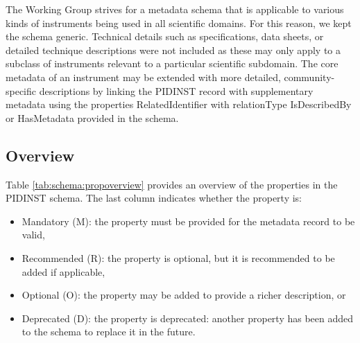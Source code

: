 \documentclass[titlepage=true,twoside=false,DIV=13]{scrartcl}
\begin{document}
The Working Group strives for a metadata schema that is applicable to
various kinds of instruments being used in all scientific domains.
For this reason, we kept the schema generic.  Technical details such
as specifications, data sheets, or detailed technique descriptions
were not included as these may only apply to a subclass of instruments
relevant to a particular scientific subdomain.  The core metadata of
an instrument may be extended with more detailed, community-specific
descriptions by linking the PIDINST record with supplementary metadata
using the properties RelatedIdentifier with relationType IsDescribedBy
or HasMetadata provided in the schema.

\subsection{Overview}

Table \ref{tab:schema:propoverview} provides an overview of the
properties in the PIDINST schema.  The last column indicates whether
the property is:
\begin{itemize}
\item Mandatory (M): the property must be provided for the metadata
  record to be valid,
\item Recommended (R): the property is optional, but it is recommended
  to be added if applicable,
\item Optional (O): the property may be added to provide a richer
  description, or
\item Deprecated (D): the property is deprecated: another property has
  been added to the schema to replace it in the future.
\end{itemize}
\end{document}
